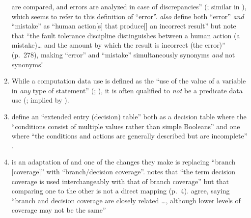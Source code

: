 \begin{enumerate}
          are compared, and errors are analyzed in case of discrepancies''
          (\citealp[p.~30]{IEEE2010}; similar in \citealpISTQB{}), which seems
          to refer to this definition of ``error''.
          \citeauthor{IEEE2017} \emph{also} define both ``error'' \emph{and}
          ``mistake'' as ``human action[s] that produce[] an incorrect result''
          \citeyearpar[pp.~165, 278, respectively]{IEEE2017} but note that
          ``the fault tolerance discipline distinguishes between a human action
          (a mistake)\dots{} and the amount by which the result is incorrect
          (the error)'' (p.~278), making ``error'' and ``mistake''
          simultaneously synonyms \emph{and} not synonyms!
    \item %
          While a computation data use is defined as the ``use of the value of a
          variable in \emph{any} type of statement'' (\citealp[p.~2]{IEEE2021c};
          \citeyear[p.~83, emphasis added]{IEEE2017}), it is
          often qualified to \emph{not} be a predicate data use
          (\citealp[p.~424]{vanVliet2000}; implied by \citealp[p.~27]{IEEE2021c}).
    \item %
          \citeauthor{IEEE2021c} define an ``extended entry (decision) table''
          both as a decision table where the ``conditions consist of multiple
          values rather than simple Booleans'' \citeyearpar[p.~18]{IEEE2021c}
          and one where ``the conditions and actions are generally described
          but are incomplete'' \citeyearpar[p.~175]{IEEE2017}.
    \item %
          \citet[Fig.~F.1]{IEEE2021c} is an adaptation of
          \citet[Fig.~2]{Reid1996} and one of the changes they make is
          replacing ``branch [coverage]'' with ``branch/decision coverage''.
          \citeauthor{Reid1996} notes that ``the term decision coverage is used
          interchangeably with that of branch coverage'' but that comparing one
          to the other is not a direct mapping (p.~4). \citeauthor{IEEE2021c}
          agree, saying ``branch and decision coverage are closely related%
          \dots{}, although lower levels of coverage may not be the same''

\end{enumerate}

